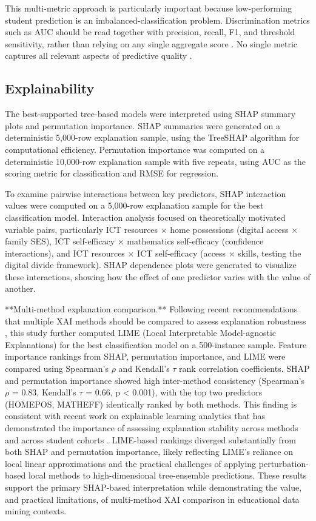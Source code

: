\documentclass[pdflatex,sn-mathphys-ay]{sn-jnl}
\begin{document}
This multi-metric approach is particularly important because low-performing student prediction is an imbalanced-classification problem. Discrimination metrics such as AUC should be read together with precision, recall, F1, and threshold sensitivity, rather than relying on any single aggregate score \citep{He_Hu_Garcia_2008,Powers_2011}. No single metric captures all relevant aspects of predictive quality \citep{Ersozlu_2024}.

\subsection{Explainability}

The best-supported tree-based models were interpreted using SHAP summary plots and permutation importance. SHAP summaries were generated on a deterministic 5,000-row explanation sample, using the TreeSHAP algorithm for computational efficiency. Permutation importance was computed on a deterministic 10,000-row explanation sample with five repeats, using AUC as the scoring metric for classification and RMSE for regression.

To examine pairwise interactions between key predictors, SHAP interaction values were computed on a 5,000-row explanation sample for the best classification model. Interaction analysis focused on theoretically motivated variable pairs, particularly ICT resources × home possessions (digital access × family SES), ICT self-efficacy × mathematics self-efficacy (confidence interactions), and ICT resources × ICT self-efficacy (access × skills, testing the digital divide framework). SHAP dependence plots were generated to visualize these interactions, showing how the effect of one predictor varies with the value of another.

**Multi-method explanation comparison.** Following recent recommendations that multiple XAI methods should be compared to assess explanation robustness \citep{Niu_2025}, this study further computed LIME (Local Interpretable Model-agnostic Explanations) \citep{Ribeiro_2016} for the best classification model on a 500-instance sample. Feature importance rankings from SHAP, permutation importance, and LIME were compared using Spearman's $\rho$ and Kendall's $\tau$ rank correlation coefficients. SHAP and permutation importance showed high inter-method consistency (Spearman's $\rho$ = 0.83, Kendall's $\tau$ = 0.66, p < 0.001), with the top two predictors (HOMEPOS, MATHEFF) identically ranked by both methods. This finding is consistent with recent work on explainable learning analytics that has demonstrated the importance of assessing explanation stability across methods and across student cohorts \citep{Tiukhova_2025}. LIME-based rankings diverged substantially from both SHAP and permutation importance, likely reflecting LIME's reliance on local linear approximations and the practical challenges of applying perturbation-based local methods to high-dimensional tree-ensemble predictions. These results support the primary SHAP-based interpretation while demonstrating the value, and practical limitations, of multi-method XAI comparison in educational data mining contexts.
\end{document}
